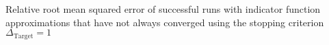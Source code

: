 Relative root mean squared error of successful runs with indicator function approximations that have not always converged using the stopping criterion $\Delta_{\text{Target}} = 1$